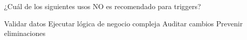 \question[1] ¿Cuál de los siguientes usos NO es recomendado para triggers?
\begin{choices}
\choice Validar datos
\CorrectChoice Ejecutar lógica de negocio compleja
\choice Auditar cambios
\choice Prevenir eliminaciones
\end{choices}